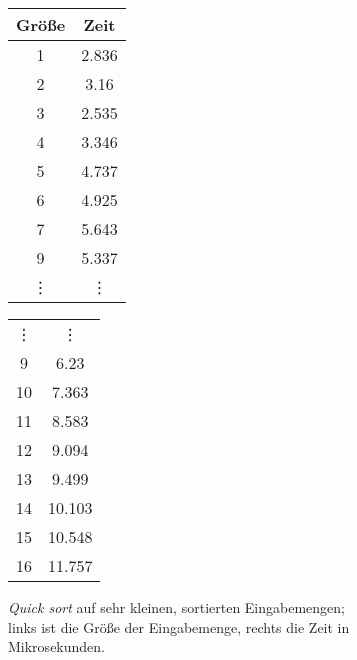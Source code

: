 \begin{figure}[ht]
    \begin{subfigure}[c]{0.49\textwidth}
        \begin{minipage}[t]{0.49\textwidth}
            \centering
            \begin{tabular}{c c}
                \toprule
                Größe & Zeit \\
                \midrule
                1 & 2.836\\
                2 & 3.16\\
                3 & 2.535\\
                4 & 3.346\\
                5 & 4.737\\
                6 & 4.925\\
                7 & 5.643\\
                9 & 5.337\\
                \vdots & \vdots \\
            \end{tabular}
        \end{minipage}
        \hfill
        \begin{minipage}[c]{0.49\textwidth}
            \begin{tabular}{c c}
                \vdots & \vdots \\
                9 & 6.23\\
                10& 7.363\\
                11& 8.583\\
                12& 9.094\\
                13& 9.499\\
                14& 10.103\\
                15& 10.548\\
                16& 11.757\\
                \bottomrule
            \end{tabular}
        \end{minipage}
        \caption{
            \emph{Quick sort} auf sehr kleinen, sortierten Eingabemengen; links ist die Größe der Eingabemenge, rechts die Zeit in Mikrosekunden.\label{subfig:funkterm-beispieldaten}
        }
    \end{subfigure}
    \hfill
    \begin{subfigure}[c]{0.49\textwidth}
        \begin{tikzpicture}

\end{tikzpicture}
\end{subfigure}
\end{figure}
